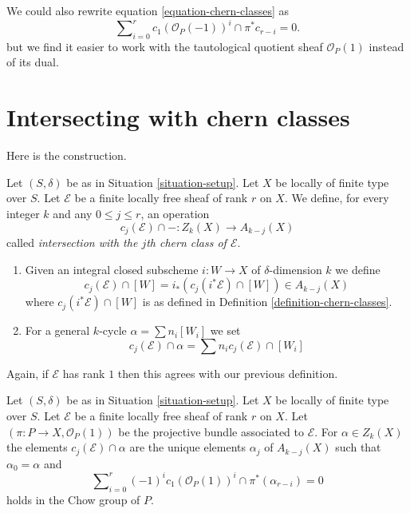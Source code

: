 \begin{remark}
\label{remark-equation-signs}
We could also rewrite equation \ref{equation-chern-classes} as
\begin{equation}
\label{equation-signs}
\sum\nolimits_{i = 0}^r
c_1(\mathcal{O}_P(-1))^i \cap \pi^*c_{r - i}
= 0.
\end{equation}
but we find it easier to work with the tautological quotient
sheaf $\mathcal{O}_P(1)$ instead of
its dual.
\end{remark}




\section{Intersecting with chern classes}
\label{section-intersecting-chern-classes}

\noindent
Here is the construction.

\begin{definition}
\label{definition-cap-chern-classes}
Let $(S, \delta)$ be as in Situation \ref{situation-setup}.
Let $X$ be locally of finite type over $S$.
Let $\mathcal{E}$ be a finite locally free sheaf of rank $r$ on $X$.
We define, for every integer $k$ and any $0 \leq j \leq r$,
an operation
$$
c_j(\mathcal{E}) \cap - : Z_k(X) \to A_{k - j}(X)
$$
called {\it intersection with the $j$th chern class of $\mathcal{E}$}.
\begin{enumerate}
\item Given an integral closed subscheme $i : W \to X$ of $\delta$-dimension
$k$ we define
$$
c_j(\mathcal{E}) \cap [W] = i_*(c_j({i^*\mathcal{E}}) \cap [W])
\in
A_{k - j}(X)
$$
where $c_j({i^*\mathcal{E}}) \cap [W]$ is as defined in
Definition \ref{definition-chern-classes}.
\item For a general $k$-cycle $\alpha = \sum n_i [W_i]$ we set
$$
c_j(\mathcal{E}) \cap \alpha = \sum n_i c_j(\mathcal{E}) \cap [W_i]
$$
\end{enumerate}
\end{definition}

\noindent
Again, if $\mathcal{E}$ has rank $1$ then this agrees with our
previous definition.

\begin{lemma}
\label{lemma-determine-intersections}
Let $(S, \delta)$ be as in Situation \ref{situation-setup}.
Let $X$ be locally of finite type over $S$.
Let $\mathcal{E}$ be a finite locally free sheaf of rank $r$ on $X$.
Let $(\pi : P \to X, \mathcal{O}_P(1))$ be the projective bundle
associated to $\mathcal{E}$.
For $\alpha \in Z_k(X)$ the elements
$c_j(\mathcal{E}) \cap \alpha$ are the unique elements
$\alpha_j$ of $A_{k - j}(X)$
such that $\alpha_0 = \alpha$ and
$$
\sum\nolimits_{i = 0}^r
(-1)^i c_1(\mathcal{O}_P(1))^i \cap
\pi^*(\alpha_{r - i}) = 0
$$
holds in the Chow group of $P$.
\end{lemma}

